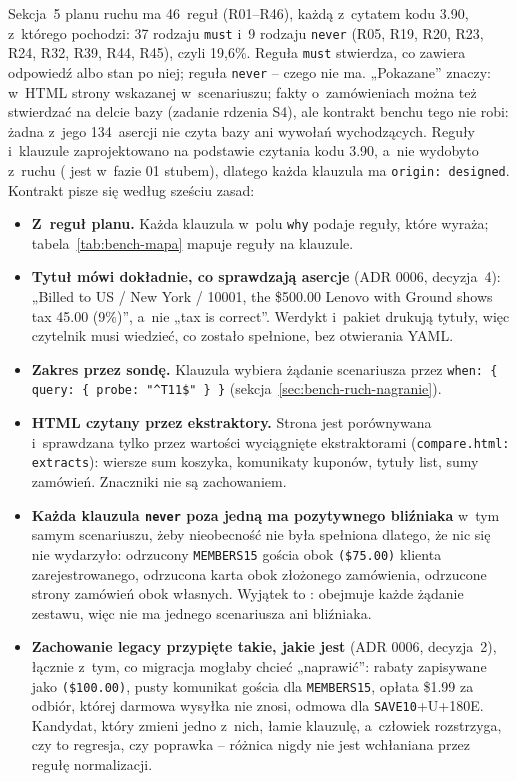 Sekcja~5 planu ruchu ma 46~reguł (R01--R46), każdą z~cytatem kodu 3.90, z~którego
pochodzi: 37 rodzaju \texttt{must} i~9 rodzaju \texttt{never} (R05, R19, R20, R23, R24,
R32, R39, R44, R45), czyli 19,6\%. Reguła \texttt{must} stwierdza, co zawiera odpowiedź
albo stan po niej; reguła \texttt{never} -- czego nie ma. „Pokazane” znaczy: w~HTML strony
wskazanej w~scenariuszu; fakty o~zamówieniach można też stwierdzać na delcie bazy (zadanie
rdzenia S4), ale kontrakt benchu tego nie robi: żadna z~jego 134~asercji nie czyta bazy ani
wywołań wychodzących. Reguły i~klauzule zaprojektowano na podstawie czytania kodu 3.90,
a~nie wydobyto z~ruchu ( jest w~fazie 01 stubem), dlatego każda klauzula
ma \texttt{origin: designed}. Kontrakt pisze się według sześciu zasad:
\begin{itemize}
  \item \textbf{Z~reguł planu.} Każda klauzula w~polu \texttt{why} podaje reguły, które
    wyraża; tabela~\ref{tab:bench-mapa} mapuje reguły na klauzule.
  \item \textbf{Tytuł mówi dokładnie, co sprawdzają asercje} (ADR 0006, decyzja~4):
    „Billed to US / New York / 10001, the \$500.00 Lenovo with Ground shows tax 45.00
    (9\%)”, a~nie „tax is correct”. Werdykt i~pakiet drukują tytuły, więc czytelnik musi
    wiedzieć, co zostało spełnione, bez otwierania YAML.
  \item \textbf{Zakres przez sondę.} Klauzula wybiera żądanie scenariusza przez
    \texttt{when: \{ query: \{ probe: "\textasciicircum{}T11\$" \} \}}
    (sekcja~\ref{sec:bench-ruch-nagranie}).
  \item \textbf{HTML czytany przez ekstraktory.} Strona jest porównywana i~sprawdzana tylko
    przez wartości wyciągnięte ekstraktorami (\texttt{compare.html: extracts}): wiersze
    sum koszyka, komunikaty kuponów, tytuły list, sumy zamówień. Znaczniki nie są
    zachowaniem.
  \item \textbf{Każda klauzula \texttt{never} poza jedną ma pozytywnego bliźniaka} w~tym
    samym scenariuszu, żeby nieobecność nie była spełniona dlatego, że nic się nie wydarzyło:
    odrzucony \texttt{MEMBERS15} gościa obok \texttt{(\$75.00)} klienta zarejestrowanego,
    odrzucona karta obok złożonego zamówienia, odrzucone strony zamówień obok własnych.
    Wyjątek to : obejmuje każde żądanie zestawu, więc nie ma
    jednego scenariusza ani bliźniaka.
  \item \textbf{Zachowanie legacy przypięte takie, jakie jest} (ADR 0006, decyzja~2),
    łącznie z~tym, co migracja mogłaby chcieć „naprawić”: rabaty zapisywane jako
    \texttt{(\$100.00)}, pusty komunikat gościa dla \texttt{MEMBERS15}, opłata \$1.99 za
    odbiór, której darmowa wysyłka nie znosi, odmowa dla \texttt{SAVE10}+U+180E. Kandydat,
    który zmieni jedno z~nich, łamie klauzulę, a~człowiek rozstrzyga, czy to regresja,
    czy poprawka -- różnica nigdy nie jest wchłaniana przez regułę normalizacji.
\end{itemize}

